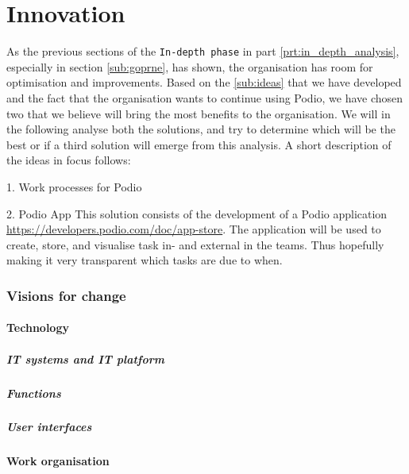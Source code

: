 \part{Innovation}
As the previous sections of the \texttt{In-depth phase} in part \ref{prt:in_depth_analysis},
especially in section \ref{sub:goprne}, has shown,
the organisation has room for optimisation and improvements. Based on the \ref{sub:ideas} that we
have developed and the fact that the organisation wants to continue using Podio, we have chosen two that we believe will bring the most benefits to the organisation.
We will in the following analyse both the solutions, and try to determine which will be the best or
if a third solution will emerge from this analysis. A short description of the ideas in focus
follows:

1. Work processes for Podio

2. Podio App
This solution consists of the development of a Podio application \hyperref[Podio application]{https://developers.podio.com/doc/app-store}. The
application will be used to create, store, and visualise task in- and external in the teams. Thus
hopefully making it very transparent which tasks are due to when.

\section{Visions for change}

\subsection{Technology}
\label{sub:technology}

\subsubsection{IT systems and IT platform}

\subsubsection{Functions}

\subsubsection{User interfaces}

\subsection{Work organisation}
\label{sub:work_organisation}

